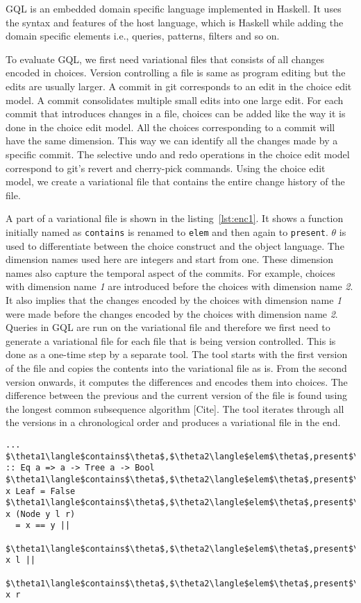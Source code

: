 GQL is an embedded domain specific language implemented in Haskell. It uses the syntax and features of the host language, which is Haskell while adding the domain specific elements i.e., queries, patterns, filters and so on.

To evaluate GQL, we first need variational files that consists of all changes encoded in choices.
Version controlling a file is same as program editing but the edits are usually larger. A commit in git corresponds to an edit in the choice edit model. A commit consolidates multiple small edits into one large edit. For each commit that introduces changes in a file, choices can be added like the way it is done in the choice edit model. All the choices corresponding to a commit will have the same dimension. This way we can identify all the changes made by a specific commit. The selective undo and redo operations in the choice edit model correspond to git's revert and cherry-pick commands. Using the choice edit model, we create a variational file that contains the entire change history of the file.

A part of a variational file is shown in the listing~\ref{lst:enc1}. It shows a function initially named as \texttt{contains} is renamed to \texttt{elem} and then again to \texttt{present}. $\theta$ is used to differentiate between the choice construct and the object language. The dimension names used here are integers and start from one. These dimension names also capture the temporal aspect of the commits. For example, choices with dimension name \textit{1} are introduced before the choices with dimension name \textit{2}. It also implies that the changes encoded by the choices with dimension name \textit{1} were made before the changes encoded by the choices with dimension name \textit{2}. Queries in GQL are run on the variational file and therefore we first need to generate a variational file for each file that is being version controlled. This is done as a one-time step by a separate tool. The tool starts with the first version of the file and copies the contents into the variational file as is. From the second version onwards, it computes the differences and encodes them into choices. The difference between the previous and the current version of the file is found using the longest common subsequence algorithm [Cite]. The tool iterates through all the versions in a chronological order and produces a variational file in the end.%

\begin{lstlisting}[caption=Encoding of version history of a program file, label=lst:enc1, gobble=0, basicstyle=\ttfamily\small]
... 
$\theta1\langle$contains$\theta$,$\theta2\langle$elem$\theta$,present$\theta\rangle$$\theta\rangle$ :: Eq a => a -> Tree a -> Bool 
$\theta1\langle$contains$\theta$,$\theta2\langle$elem$\theta$,present$\theta\rangle$$\theta\rangle$ x Leaf = False 
$\theta1\langle$contains$\theta$,$\theta2\langle$elem$\theta$,present$\theta\rangle$$\theta\rangle$ x (Node y l r) 
  = x == y || 
    $\theta1\langle$contains$\theta$,$\theta2\langle$elem$\theta$,present$\theta\rangle$$\theta\rangle$ x l ||
    $\theta1\langle$contains$\theta$,$\theta2\langle$elem$\theta$,present$\theta\rangle$$\theta\rangle$ x r
\end{lstlisting}
